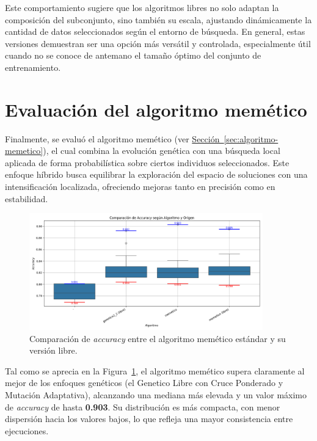 Este comportamiento sugiere que los algoritmos libres no solo adaptan la composición del subconjunto, sino también su escala, 
ajustando dinámicamente la cantidad de datos seleccionados según el entorno de búsqueda.
En general, estas versiones demuestran ser una opción más versátil y controlada, especialmente útil cuando no se conoce de antemano el tamaño óptimo del conjunto de entrenamiento.


\section{Evaluación del algoritmo memético}\label{sec:evaluacion-algoritmo-memetico}
Finalmente, se evaluó el algoritmo memético (ver \hyperref[sec:algoritmo-memetico]{Sección~\ref*{sec:algoritmo-memetico}}), 
el cual combina la evolución genética con una búsqueda local aplicada de forma probabilística sobre ciertos individuos seleccionados.
Este enfoque híbrido busca equilibrar la exploración del espacio de soluciones con una intensificación localizada, 
ofreciendo mejoras tanto en precisión como en estabilidad.


\begin{figure}[H]
\centering
\includegraphics[width=0.9\textwidth]{imagenes/evaluaciones/comparacion-memetico}
\caption{Comparación de \textit{accuracy} entre el algoritmo memético estándar y su versión libre.}
\label{fig:memetico_comparacion}
\end{figure}

Tal como se aprecia en la Figura~\ref{fig:memetico_comparacion}, el algoritmo memético supera claramente al mejor de los enfoques genéticos 
(el Genetico Libre con Cruce Ponderado y Mutación Adaptativa), alcanzando una mediana más elevada y un valor máximo de \textit{accuracy} de hasta \textbf{0.903}.
Su distribución es más compacta, con menor dispersión hacia los valores bajos, lo que refleja una mayor consistencia entre ejecuciones.

